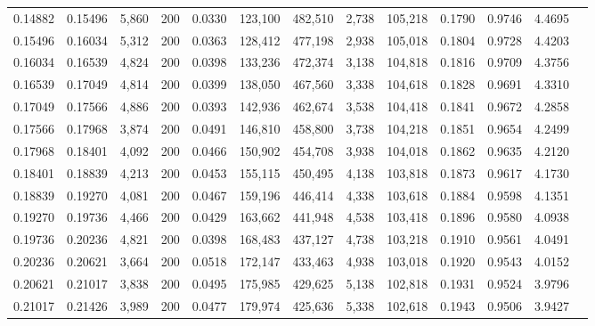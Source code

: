 \begin{tabular}{rrrrrrrrrrrrr}
0.14882 & 0.15496 &  5,860 & 200 &                                     0.0330 & 123,100 & 482,510 &   2,738 & 105,218 & 0.1790 & 0.9746 & 4.4695 \\
0.15496 & 0.16034 &  5,312 & 200 &                                     0.0363 & 128,412 & 477,198 &   2,938 & 105,018 & 0.1804 & 0.9728 & 4.4203 \\
0.16034 & 0.16539 &  4,824 & 200 &                                     0.0398 & 133,236 & 472,374 &   3,138 & 104,818 & 0.1816 & 0.9709 & 4.3756 \\
0.16539 & 0.17049 &  4,814 & 200 &                                     0.0399 & 138,050 & 467,560 &   3,338 & 104,618 & 0.1828 & 0.9691 & 4.3310 \\
0.17049 & 0.17566 &  4,886 & 200 &                                     0.0393 & 142,936 & 462,674 &   3,538 & 104,418 & 0.1841 & 0.9672 & 4.2858 \\
0.17566 & 0.17968 &  3,874 & 200 &                                     0.0491 & 146,810 & 458,800 &   3,738 & 104,218 & 0.1851 & 0.9654 & 4.2499 \\
0.17968 & 0.18401 &  4,092 & 200 &                                     0.0466 & 150,902 & 454,708 &   3,938 & 104,018 & 0.1862 & 0.9635 & 4.2120 \\
0.18401 & 0.18839 &  4,213 & 200 &                                     0.0453 & 155,115 & 450,495 &   4,138 & 103,818 & 0.1873 & 0.9617 & 4.1730 \\
0.18839 & 0.19270 &  4,081 & 200 &                                     0.0467 & 159,196 & 446,414 &   4,338 & 103,618 & 0.1884 & 0.9598 & 4.1351 \\
0.19270 & 0.19736 &  4,466 & 200 &                                     0.0429 & 163,662 & 441,948 &   4,538 & 103,418 & 0.1896 & 0.9580 & 4.0938 \\
0.19736 & 0.20236 &  4,821 & 200 &                                     0.0398 & 168,483 & 437,127 &   4,738 & 103,218 & 0.1910 & 0.9561 & 4.0491 \\
0.20236 & 0.20621 &  3,664 & 200 &                                     0.0518 & 172,147 & 433,463 &   4,938 & 103,018 & 0.1920 & 0.9543 & 4.0152 \\
0.20621 & 0.21017 &  3,838 & 200 &                                     0.0495 & 175,985 & 429,625 &   5,138 & 102,818 & 0.1931 & 0.9524 & 3.9796 \\
0.21017 & 0.21426 &  3,989 & 200 &                                     0.0477 & 179,974 & 425,636 &   5,338 & 102,618 & 0.1943 & 0.9506 & 3.9427 \\

\end{tabular}
